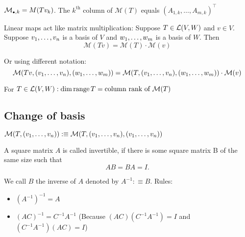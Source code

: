   \setcounter{thm}{74}
  \begin{thm}
    $\mathcal{M}_{\mathsmaller{\bullet}, k} = M(T v_k)$. The $k^{\text{th}}$ column of $\mathcal{M}(T)$ equals $(A_{1,k}, \dots, A_{m,k})^\top$
  \end{thm}

  \begin{thm}
    Linear maps act like matrix multiplication: Suppose $T\in {\mathcal{L}(V,W)}$ and $v\in V$. Suppose $v_1, \dots, v_n$ is a basis of $V$ and $w_1, \dots, w_m$ is a basis of $W$. Then
    \begin{equation}
      \mathcal{M} (Tv)=\mathcal{M}(T) \cdot \mathcal{M}(v)
    \end{equation}

    Or using different notation:
    \begin{equation}
      \mathcal{M} (Tv, (v_1, \dots, v_n), (w_1, \dots, w_m))=\mathcal{M}(T, (v_1, \dots, v_n), (w_1, \dots, w_m)) \cdot \mathcal{M}(v)
    \end{equation}

  \end{thm}

  \setcounter{thm}{77}
  \begin{thm}
    For $T \in {\mathcal{L}(V,W)}: \dim \operatorname{range} T = \text{column rank of } \mathcal{M} (T)$
  \end{thm}

  \subsection{Change of basis}

  \begin{mydef-non}
    $\mathcal{M}(T, (v_1, \dots, v_n)) :\equiv \mathcal{M}(T, (v_1, \dots, v_n),(v_1, \dots, v_n))$
  \end{mydef-non}

  \setcounter{thm}{79}
  \begin{thm}
    A square matrix $A$ is called invertible, if there is some square matrix B of the same size such that 
    \begin{equation}
    	AB=BA=I.
    \end{equation} 
    
    We call $B$ the inverse of $A$ denoted by $A^{-1} :\equiv B$. Rules:
    \begin{itemize}
      \item $(A^{-1})^{-1}=A$
      \item $(AC)^{-1} = C^{-1}A^{-1}$ (Because $(AC)(C^{-1}A^{-1})=I$ and $(C^{-1}A^{-1})(AC)=I$)
    \end{itemize}
  \end{thm}

